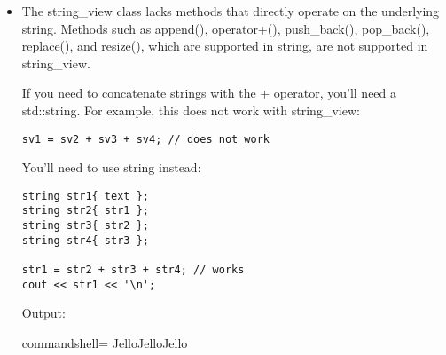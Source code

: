 \begin{itemize}
\item 
The string\_view class lacks methods that directly operate on the underlying string. Methods such as append(), operator+(), push\_back(), pop\_back(), replace(), and resize(), which are supported in string, are not supported in string\_view.

If you need to concatenate strings with the + operator, you'll need a std::string. For example, this does not work with string\_view:

\begin{lstlisting}[style=styleCXX]
sv1 = sv2 + sv3 + sv4; // does not work
\end{lstlisting}

You'll need to use string instead:

\begin{lstlisting}[style=styleCXX]
string str1{ text };
string str2{ str1 };
string str3{ str2 };
string str4{ str3 };

str1 = str2 + str3 + str4; // works
cout << str1 << '\n';
\end{lstlisting}

Output:

\begin{tcblisting}{commandshell={}}
JelloJelloJello
\end{tcblisting}
\end{itemize}

